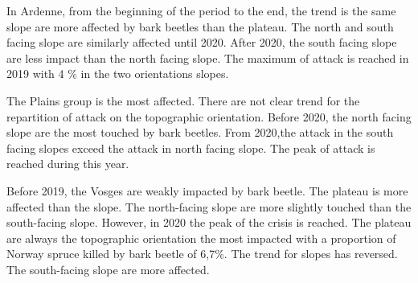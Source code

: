 \documentclass[3p,procedia]{elsarticle}
\begin{document}
In Ardenne, from the beginning of the period to the end, the trend is the same slope are more affected by bark beetles than the plateau. 
The north and south facing slope are similarly affected until 2020. 
After 2020, the south facing slope are less impact than the north facing slope. 
The maximum of attack is reached in 2019 with 4 \% in the two orientations slopes.

The Plains group is the most affected. 
There are not clear trend for the repartition of attack on the topographic orientation.
Before 2020, the north facing slope are the most touched by bark beetles.
From 2020,the attack in the south facing slopes exceed the attack in north facing slope. 
The peak of attack is reached during this year.

Before 2019, the Vosges are weakly impacted by bark beetle. 
The plateau is more affected than the slope.
The north-facing slope are more slightly touched than the south-facing slope. 
However, in 2020 the peak of the crisis is reached. 
The plateau are always the topographic orientation the most impacted with a proportion of Norway spruce killed by bark beetle of 6,7\%.
The trend for slopes has reversed. 
The south-facing slope are more affected. 
\end{document}
